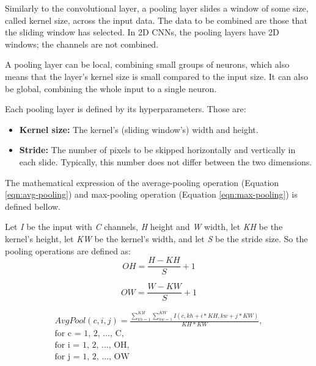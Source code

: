 Similarly to the convolutional layer, a pooling layer slides a window of some size, called kernel size, across the input data. The data to be combined are those that the sliding window has selected. In 2D CNNs, the pooling layers have 2D windows; the channels are not combined.

A pooling layer can be local, combining small groups of neurons, which also means that the layer's kernel size is small compared to the input size. It can also be global, combining the whole input to a single neuron.

Each pooling layer is defined by its hyperparameters. Those are:
\begin{itemize}
	\item \textbf{Kernel size:} The kernel's (sliding window's) width and height.
	\item \textbf{Stride:} The number of pixels to be skipped horizontally and vertically in each slide. Typically, this number does not differ between the two dimensions.
\end{itemize}

The mathematical expression of the average-pooling operation (Equation \ref{eqn:avg-pooling}) and max-pooling operation (Equation \ref{eqn:max-pooling}) is defined bellow.

Let \emph{I} be the input with \emph{C} channels, \emph{H} height and \emph{W} width, let \emph{KH} be the kernel's height, let \emph{KW} be the kernel's width, and let \emph{S} be the stride size. So the pooling operations are defined as:
\begin{equation}
	OH = \frac{H - KH}{S} + 1
\end{equation}

\begin{equation}
	OW = \frac{W - KW}{S} + 1
\end{equation}

\begin{equation}
	\label{eqn:avg-pooling}
	\begin{split}
		AvgPool(c, i, j) =
		\frac{
			\sum_{kh = 1}^{KH} \sum_{kw = 1}^{KW}
			I(c, kh + i * KH, kw + j * KW)
		}{
			KH * KW
		},\\
		\mbox{for c = 1, 2, ..., C},\\
		\mbox{for i = 1, 2, ..., OH},\\
		\mbox{for j = 1, 2, ..., OW}\\
	\end{split}
\end{equation}

